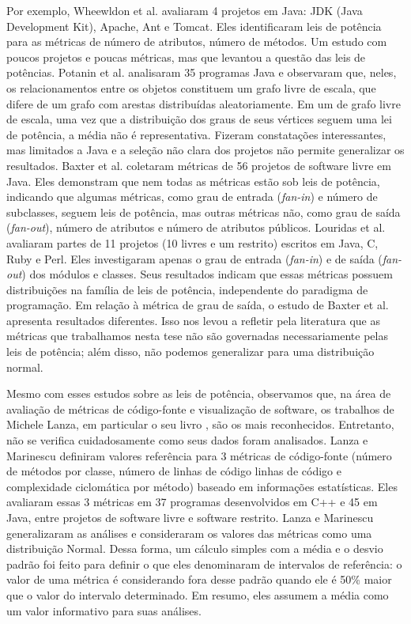 \documentclass{llncs}
\begin{document}
Por exemplo, Wheewldon et al.\cite{Wheeldon2003} avaliaram 4 projetos em Java:
JDK (Java Development Kit), Apache, Ant e Tomcat.
%
Eles identificaram leis de potência para as métricas de número de atributos,
número de métodos. Um estudo com poucos projetos e poucas métricas, mas que
levantou a questão das leis de potências.
%
Potanin et al.\cite{Potanin2005} analisaram 35 programas Java e observaram que,
neles, os relacionamentos entre os objetos constituem um grafo livre de escala,
que difere de um grafo com arestas distribuídas aleatoriamente. Em um de grafo
livre de escala, uma vez que a distribuição dos graus de seus vértices seguem
uma lei de potência, a média não é representativa. Fizeram constatações
interessantes, mas limitados a Java e a seleção não clara dos projetos não
permite generalizar os resultados.
%
Baxter et al.\cite{Baxter2006} coletaram métricas de 56 projetos de software
livre em Java.  Eles demonstram que nem todas as métricas estão sob leis de
potência, indicando que algumas métricas, como grau de entrada
(\textit{fan-in}) e número de subclasses, seguem leis de potência, mas outras
métricas não, como grau de saída (\textit{fan-out}), número de atributos e
número de atributos públicos.
%
Louridas et al.\cite{Louridas2008} avaliaram partes de 11 projetos (10 livres e
um restrito) escritos em Java, C, Ruby e Perl.
%
Eles investigaram apenas o grau de entrada (\textit{fan-in}) e de saída
(\textit{fan-out}) dos módulos e classes. Seus resultados  indicam que essas
métricas possuem distribuições na família de leis de potência, independente do
paradigma de programação.
%
Em relação à métrica de grau de saída, o estudo de Baxter et
al.\cite{Baxter2006} apresenta resultados diferentes. Isso nos levou a refletir
pela literatura que as métricas que trabalhamos nesta tese não são governadas
necessariamente pelas leis de potência; além disso, não podemos generalizar
para uma distribuição normal.

Mesmo com esses estudos sobre as leis de potência, observamos que, na área de
avaliação de métricas de código-fonte e visualização de software, os trabalhos
de Michele Lanza, em particular o seu livro \cite{Lanza2006}, são os mais
reconhecidos.
%
Entretanto, não se verifica cuidadosamente como seus dados foram analisados.
%
Lanza e Marinescu\cite{Lanza2006} definiram valores referência para 3 métricas
de código-fonte (número de métodos por classe, número de linhas de código
linhas de código e complexidade ciclomática por método) baseado em informações
estatísticas.
%
Eles avaliaram essas 3 métricas em 37 programas desenvolvidos em C++ e 45 em
Java, entre projetos de software livre e software restrito.
%
Lanza e Marinescu\cite{Lanza2006} generalizaram as análises e consideraram os
valores das métricas como uma distribuição Normal.
%
Dessa forma, um cálculo simples com a média e o desvio padrão foi feito para
definir o que eles denominaram de intervalos de referência:
%
o valor de uma métrica é considerando fora desse padrão quando ele é 50\% maior
que o valor do intervalo determinado. Em resumo, eles assumem a média como um
valor informativo para suas análises.
\end{document}
